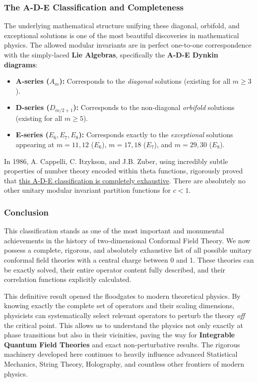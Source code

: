 \subsubsection{The A-D-E Classification and Completeness}

The underlying mathematical structure unifying these diagonal, orbifold, and exceptional solutions is one of the most beautiful discoveries in mathematical physics. The allowed modular invariants are in perfect one-to-one correspondence with the simply-laced \textbf{Lie Algebras}, specifically the \textbf{A-D-E Dynkin diagrams}:
\begin{itemize}
    \item \textbf{A-series (\(A_m\)):} Corresponds to the \textit{diagonal} solutions (existing for all \(m \ge 3\)).
    \item \textbf{D-series (\(D_{m/2+1}\)):} Corresponds to the non-diagonal \textit{orbifold} solutions (existing for all \(m \ge 5\)).
    \item \textbf{E-series (\(E_6, E_7, E_8\)):} Corresponds exactly to the \textit{exceptional} solutions appearing at \(m=11,12\) (\(E_6\)), \(m=17,18\) (\(E_7\)), and \(m=29,30\) (\(E_8\)).
\end{itemize}

In 1986, A. Cappelli, C. Itzykson, and J.B. Zuber, using incredibly subtle properties of number theory encoded within theta functions, rigorously proved that \uline{this A-D-E classification is completely exhaustive}. There are absolutely no other unitary modular invariant partition functions for \(c < 1\).

\subsubsection{Conclusion}

This classification stands as one of the most important and monumental achievements in the history of two-dimensional Conformal Field Theory. We now possess a complete, rigorous, and absolutely exhaustive list of all possible unitary conformal field theories with a central charge between 0 and 1. These theories can be exactly solved, their entire operator content fully described, and their correlation functions explicitly calculated.

This definitive result opened the floodgates to modern theoretical physics. By knowing exactly the complete set of operators and their scaling dimensions, physicists can systematically select relevant operators to perturb the theory \textit{off} the critical point. This allows us to understand the physics not only exactly at phase transitions but also in their vicinities, paving the way for \textbf{Integrable Quantum Field Theories} and exact non-perturbative results. The rigorous machinery developed here continues to heavily influence advanced Statistical Mechanics, String Theory, Holography, and countless other frontiers of modern physics.